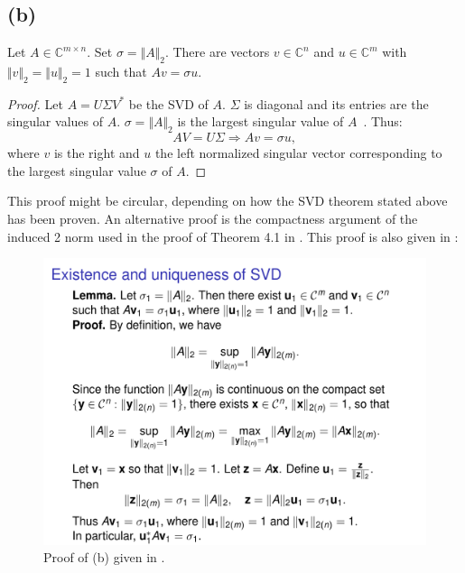 \documentclass[a4paper, 11pt]{article}
\begin{document}
\subsection*{(b)}
Let $A \in \mathbb{C}^{m\times n}$. Set $\sigma = \Vert A\Vert_2$. There are
vectors $v \in \mathbb{C}^{n}$ and $u \in \mathbb{C}^m$ with $\Vert v\Vert_2 =
\Vert u\Vert_2 = 1$ such that $Av=\sigma u$.
\begin{proof}
  Let $A = U\Sigma V^*$ be the SVD of $A$. $\Sigma$ is diagonal and its entries
  are the singular values of $A$. $\sigma = \Vert A\Vert_2$ is the largest
  singular value of $A$~\cite[Theorem 5.3]{tb}. Thus:
  \begin{equation}
    AV = U\Sigma \Rightarrow Av = \sigma u,
  \end{equation}
  where $v$ is the right and $u$ the left normalized singular vector
  corresponding to the largest singular value $\sigma$ of $A$.
\end{proof}
This proof might be circular, depending on how the SVD theorem stated above has
been proven. An alternative proof is the compactness argument of the induced 2
norm used in the proof of Theorem 4.1 in \cite{tb}. This proof is also
given in \cite{slides}:
\begin{figure}[H]
  \centering
  \includegraphics[width=\textwidth]{./compactness_slide.png}
  \caption{Proof of (b) given in \cite{slides}.}
\end{figure}
\end{document}
